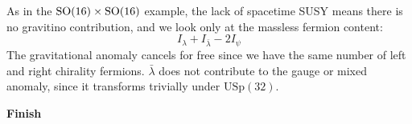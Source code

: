 \documentclass[11pt, class=article, crop=false]{standalone}
\begin{document}
\begin{enumerate}
	As in the $\mathrm{SO}(16) \times \mathrm{SO}(16)$ example, the lack of spacetime SUSY means there is no gravitino contribution, and we look only at the massless fermion content:
	\[
		I_{\lambda} + I_{\bar \lambda} - 2 I_{\psi}
	\]
	The gravitational anomaly cancels for free since we have the same number of left and right chirality fermions. $\bar \lambda$ does not contribute to the gauge or mixed anomaly, since it transforms trivially under $\mathrm{USp}(32)$. 
	
	\textbf{Finish}
	
	
\end{enumerate}
	
\end{document}
